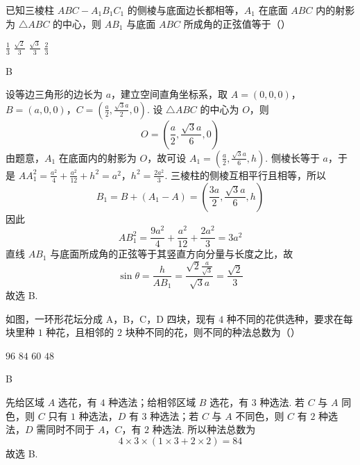 \begin{problem}
已知三棱柱 \(ABC - A_{1}B_{1}C_{1}\) 的侧棱与底面边长都相等，\(A_{1}\) 在底面 \(ABC\) 内的射影为 \(\triangle ABC\) 的中心，则 \(AB_{1}\) 与底面 \(ABC\) 所成角的正弦值等于（\quad）

\choices
    {\(\frac{1}{3}\)}
    {\(\frac{\sqrt{2}}{3}\)}
    {\(\frac{\sqrt{3}}{3}\)}
    {\(\frac{2}{3}\)}
\end{problem}

\begin{answer}
B
\end{answer}

\begin{solution}
设等边三角形的边长为 \(a\)，建立空间直角坐标系，取 \(A=(0,0,0)\)，\(B=(a,0,0)\)，\(C=\left(\frac{a}{2},\frac{\sqrt{3}a}{2},0\right)\).
设 \(\triangle ABC\) 的中心为 \(O\)，则
\[
O=\left(\frac{a}{2},\frac{\sqrt{3}a}{6},0\right)
\]
由题意，\(A_1\) 在底面内的射影为 \(O\)，故可设 \(A_1=(\frac{a}{2},\frac{\sqrt{3}a}{6},h)\). 侧棱长等于 \(a\)，于是
\(AA_1^2=\frac{a^2}{4}+\frac{a^2}{12}+h^2=a^2\)，\(h^2=\frac{2a^2}{3}\).
三棱柱的侧棱互相平行且相等，所以
\[
B_1=B+(A_1-A)=\left(\frac{3a}{2},\frac{\sqrt{3}a}{6},h\right)
\]
因此
\[
AB_1^2=\frac{9a^2}{4}+\frac{a^2}{12}+\frac{2a^2}{3}=3a^2
\]
直线 \(AB_1\) 与底面所成角的正弦等于其竖直方向分量与长度之比，故
\[
\sin\theta=\frac{h}{AB_1}=\frac{\sqrt{2}\frac{a}{\sqrt{3}}}{\sqrt{3}a}=\frac{\sqrt{2}}{3}
\]
故选 B.
\end{solution}

\begin{problem}
如图，一环形花坛分成 A，B，C，D 四块，现有 \(4\) 种不同的花供选种，要求在每块里种 \(1\) 种花，且相邻的 \(2\) 块种不同的花，则不同的种法总数为（\quad）


\choices
    {\(96\)}
    {\(84\)}
    {\(60\)}
    {\(48\)}
\end{problem}

\begin{answer}
B
\end{answer}

\begin{solution}
先给区域 \(A\) 选花，有 \(4\) 种选法；给相邻区域 \(B\) 选花，有 \(3\) 种选法. 若 \(C\) 与 \(A\) 同色，则 \(C\) 只有 \(1\) 种选法，\(D\) 有 \(3\) 种选法；若 \(C\) 与 \(A\) 不同色，则 \(C\) 有 \(2\) 种选法，\(D\) 需同时不同于 \(A\)，\(C\)，有 \(2\) 种选法. 所以种法总数为
\[
4\times 3\times(1\times 3+2\times 2)=84
\]
故选 B.
\end{solution}

